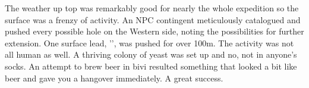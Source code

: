 The weather up top was remarkably good for nearly the whole expedition so the surface was a frenzy of activity. An NPC contingent meticulously catalogued and pushed every possible hole on the Western side, noting the possibilities for further extension. One surface lead, '', was pushed for over 100m. The activity was not all human as well. A thriving colony of yeast was set up and no, not in anyone’s socks. An attempt to brew beer in bivi resulted something that looked a bit like beer and gave you a hangover immediately. A great success.
